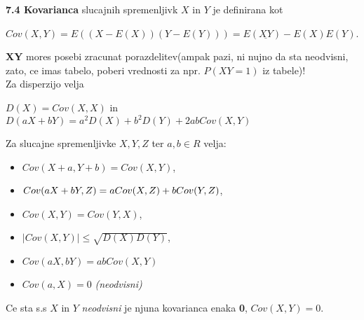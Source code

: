 \documentclass{article}
\begin{document}
\begin{multicols}{3}
\textbf{7.4 Kovarianca} slucajnih spremenljivk $X$ in $Y$ je definirana kot
\begin{center}
    \begin{math}
        Cov(X,Y) = E((X - E(X)) (Y - E(Y))) = E(\underline{XY}) - E(X)E(Y)
    \end{math}.
\end{center}
\textbf{XY} mores posebi zracunat porazdelitev(ampak pazi, ni nujno da sta neodvisni, zato, ce imas tabelo, poberi vrednosti za npr. $P(XY = 1)$ iz tabele)!\\
Za disperzijo velja
\begin{center}
    \begin{math}
        D(X) = Cov(X, X)
    \end{math} in\\
    \begin{math}
        D(aX + bY) = a^2D(X) + b^2D(Y) + 2abCov(X, Y)
    \end{math}
\end{center}
Za slucajne spremenljivke $X, Y, Z$ ter $a,b \in R$ velja:
\begin{itemize}
    \item \begin{math}
        Cov(X + a, Y + b) = Cov(X, Y)
    \end{math},
    \item \begin{math}
        Cov(aX + bY, Z) =\\ aCov(X, Z) + bCov(Y,Z)
    \end{math},
    \item \begin{math}
        Cov(X, Y) = Cov(Y, X)
    \end{math},
    \item \begin{math}
        |Cov(X, Y)| \leq \sqrt{D(X)D(Y)}
    \end{math},
    \item \begin{math}
        Cov(aX, bY) = abCov(X, Y)
    \end{math}
    \item \begin{math}
        Cov(a, X) = 0 
    \end{math} \textit{(neodvisni)}
\end{itemize}

Ce sta s.s $X$ in $Y$ \textit{neodvisni} je njuna kovarianca enaka \textbf{0},
$Cov(X,Y) = 0$.


\end{multicols}
\end{document}
